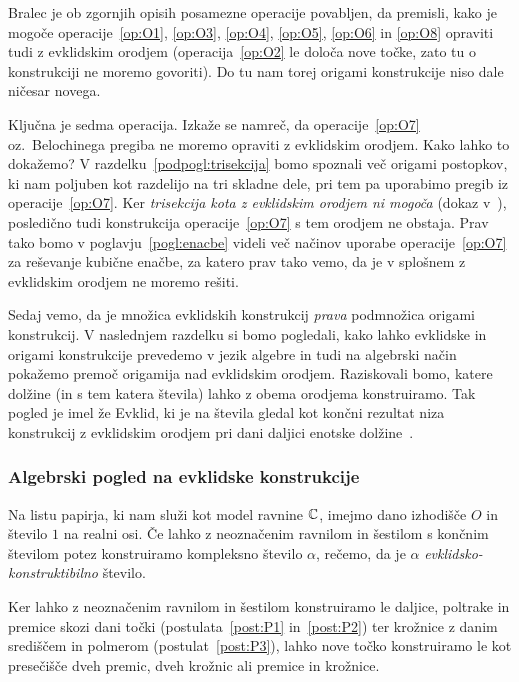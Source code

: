 Bralec je ob zgornjih opisih posamezne operacije povabljen, da premisli, kako je mogoče operacije~\ref{op:O1}, \ref{op:O3}, \ref{op:O4}, \ref{op:O5}, \ref{op:O6} in \ref{op:O8} opraviti tudi z evklidskim orodjem (operacija~\ref{op:O2} le določa nove točke, zato tu o konstrukciji ne moremo govoriti). Do tu nam torej origami konstrukcije niso dale ničesar novega.

Ključna je sedma operacija. Izkaže se namreč, da operacije~\ref{op:O7} oz.\ Belochinega pregiba ne moremo opraviti z evklidskim orodjem. Kako lahko to dokažemo? V razdelku~\ref{podpogl:trisekcija} bomo spoznali več origami postopkov, ki nam poljuben kot razdelijo na tri skladne dele, pri tem pa uporabimo pregib iz operacije~\ref{op:O7}. Ker \emph{trisekcija kota z evklidskim orodjem ni mogoča} (dokaz v~\cite[str.\ 77--78]{jerman1998}), posledično tudi konstrukcija operacije~\ref{op:O7} s tem orodjem ne obstaja. Prav tako bomo v poglavju~\ref{pogl:enacbe} videli več načinov uporabe operacije~\ref{op:O7} za reševanje kubične enačbe, za katero prav tako vemo, da je v splošnem z evklidskim orodjem ne moremo rešiti.

Sedaj vemo, da je množica evklidskih konstrukcij \emph{prava} podmnožica origami konstrukcij. V naslednjem razdelku si bomo pogledali, kako lahko evklidske in origami konstrukcije prevedemo v jezik algebre in tudi na algebrski način pokažemo premoč origamija nad evklidskim orodjem. Raziskovali bomo, katere dolžine (in s tem katera števila) lahko z obema orodjema konstruiramo. Tak pogled je imel že Evklid, ki je na števila gledal kot končni rezultat niza konstrukcij z evklidskim orodjem pri dani daljici enotske dolžine~\cite[str. 164]{michael2005}.

\subsubsection{Algebrski pogled na evklidske konstrukcije}
\label{podpogl:evkl_konstruktibilnost}

\begin{definicija}
    Na listu papirja, ki nam služi kot model ravnine $\mathbb C$, imejmo dano izhodišče $O$ in število $1$ na realni osi. Če lahko z neoznačenim ravnilom in šestilom s končnim številom potez konstruiramo kompleksno število $\alpha$, rečemo, da je $\alpha$ \emph{evklidsko-konstruktibilno} število.
\end{definicija}

\begin{opomba}
    Ker lahko z neoznačenim ravnilom in šestilom konstruiramo le daljice, poltrake in premice skozi dani točki (postulata~\ref{post:P1} in~\ref{post:P2}) ter krožnice z danim središčem in polmerom (postulat~\ref{post:P3}), lahko nove točko konstruiramo le kot presečišče dveh premic, dveh krožnic ali premice in krožnice.
\end{opomba}

